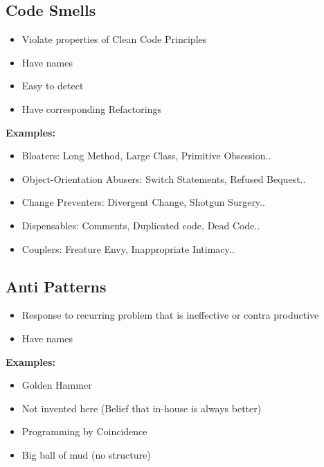 \subsection{Code Smells}
\begin{itemize}
    \item Violate properties of Clean Code Principles
    \item Have names
    \item Easy to detect
    \item Have corresponding Refactorings
\end{itemize}
\textbf{Examples:}
\begin{itemize}
    \item Bloaters: Long Method, Large Class, Primitive Obsession..
    \item Object-Orientation Abusers: Switch Statements, Refused Bequest..
    \item Change Preventers: Divergent Change, Shotgun Surgery..
    \item Dispensables: Comments, Duplicated code, Dead Code..
    \item Couplers: Freature Envy, Inappropriate Intimacy..
\end{itemize}

\subsection{Anti Patterns}
\begin{itemize}
    \item Response to recurring problem that is ineffective or contra productive
    \item Have names
\end{itemize}
\textbf{Examples:}
\begin{itemize}
    \item Golden Hammer
    \item Not invented here (Belief that in-house is always better)
    \item Programming by Coincidence
    \item Big ball of mud (no structure)
\end{itemize}

